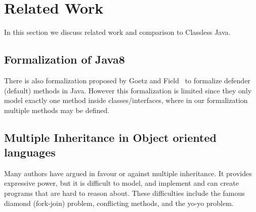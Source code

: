 \section{Related Work}\label{sec:related}
In this section we discuss related work and comparison to Classless Java.


\subsection{Formalization of Java8}
There is also formalization proposed by
Goetz and Field~\cite{goetz12fdefenders} to formalize defender (default) methods
in Java. However this formalization is limited since they only model exactly one
method inside classes/interfaces, where in our formalization multiple methods
may be defined.





\subsection{Multiple Inheritance in Object oriented languages}
Many authors have argued in favour or against multiple inheritance.
It provides expressive power, but it is difficult to model, and implement and can create programs that are hard to reason about.
These difficulties include the famous
diamond (fork-join) problem, conflicting methods, and the yo-yo problem.

